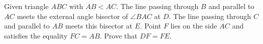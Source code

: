 Given triangle $ABC$ with $AB<AC$. The line passing through $B$ and parallel to $AC$ meets the external angle bisector of $\angle BAC$ at $D$. The line passing through $C$ and parallel to $AB$ meets this bisector at $E$. Point $F$ lies on the side $AC$ and satisfies the equality $FC=AB$. Prove that $DF=FE$.